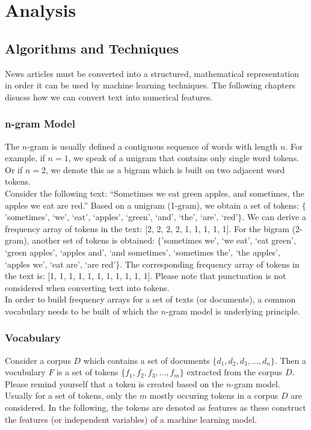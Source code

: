 \documentclass[a4paper,12pt,nottoc]{article}
\begin{document}
\section{Analysis}

\subsection{Algorithms and Techniques}

News articles must be converted into a structured, mathematical representation in order it can be used by machine learning techniques. The following chapters disucss how we can convert text into numerical features.

\subsubsection{n-gram Model}

The $n$-gram is usually defined a contiguous sequence of words with length $n$. For example, if $n = 1$, we speak of a unigram that contains only single word tokens. Or if $n = 2$, we denote this as a bigram which is built on two adjacent word tokens.\\

\noindent Consider the following text: ``Sometimes we eat green apples, and sometimes, the apples we eat are red.'' Based on a unigram (1-gram), we obtain a set of tokens: $\{$'sometimes', `we', `eat', `apples', `green', `and', `the', `are', `red'$\}$. We can derive a frequency array of tokens in the text: [2, 2, 2, 2, 1, 1, 1, 1, 1]. For the bigram (2-gram), another set of tokens is obtained: $\{$'sometimes we', `we eat', `eat green', `green apples', `apples and', `and sometimes', `sometimes the', `the apples', `apples we', `eat are', `are red'$\}$. The corresponding frequency array of tokens in the text is: [1, 1, 1, 1, 1, 1, 1, 1, 1, 1, 1]. Please note that punctuation is not considered when converting text into tokens.\\

\noindent In order to build frequency arrays for a set of texts (or documents), a common vocabulary needs to be built of which the $n$-gram model is underlying principle.

\subsubsection{Vocabulary}

Consider a corpus $D$ which contains a set of documents $\{d_1, d_2, d_3, ..., d_n\}$. Then a vocubulary $F$ is a set of tokens $\{f_1, f_2, f_3, ..., f_m\}$ extracted from the corpus $D$. Please remind yourself that a token is created based on the $n$-gram model. Usually for a set of tokens, only the $m$ mostly occuring tokens in a corpus $D$ are considered. In the following, the tokens are denoted as features as these construct the features (or independent variables) of a machine learning model.\\
\end{document}
